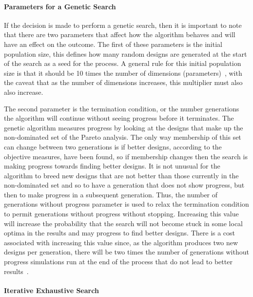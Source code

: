 \paragraph{Parameters for a Genetic Search}

If the decision is made to perform a genetic search, then it is important to note that there are two parameters that affect how the algorithm behaves and will have an effect on the outcome.  The first of these parameters is the initial population size, this defines how many random designs are generated at the start of the search as a seed for the process.  A general rule for this initial population size is that it should be 10 times the number of dimensions (parameters)~\cite{diaz07initial}, with the caveat that as the number of dimensions increases, this multiplier must also also increase.

The second parameter is the termination condition, or the number generations the algorithm will continue without seeing progress before it terminates.  The genetic algorithm measures progress by looking at the designs that make up the non-dominated set of the Pareto analysis.  The only way membership of this set can change between two generations is if better designs, according to the objective measures, have been found, so if membership changes then the search is making progress towards finding better designs.  It is not unusual for the algorithm to breed new designs that are not better than those currently in the non-dominated set and so to have a generation that does not show progress, but then to make progress in a subsequent generation.  Thus, the number of generations without progress parameter is used to relax the termination condition to permit generations without progress without stopping.  Increasing this value will increase the probability that the search will not become stuck in some local optima in the results and may progress to find better designs.  There is a cost associated with increasing this value since, as the algorithm produces two new designs per generation, there will be two times the number of generations without progress simulations run at the end of the process that do not lead to better results~\cite{Fitzgerald&17a}.




\paragraph{Iterative Exhaustive Search}

